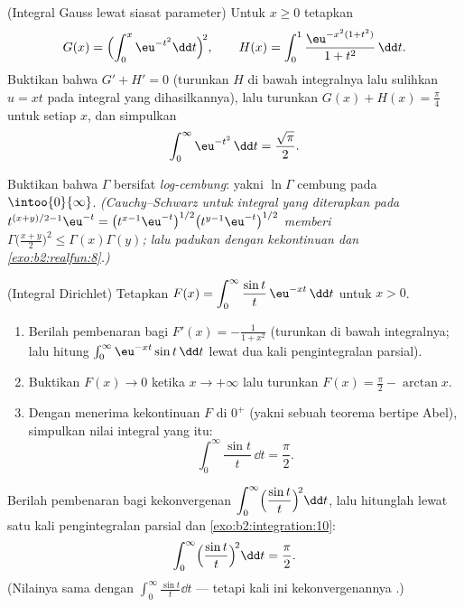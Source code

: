 \begin{exercise}[$\star\star\star$]\label{exo:b2:integration:8}
(Integral Gauss lewat siasat parameter) Untuk $x \geq 0$ tetapkan
\[
G(x) = \Bigl(\int_0^x \eu^{-t^2}\dd t\Bigr)^{\!2},
\qquad
H(x) = \int_0^1 \frac{\eu^{-x^2(1+t^2)}}{1 + t^2}\,\dd t .
\]
Buktikan bahwa $G' + H' = 0$ (turunkan $H$ di bawah integralnya lalu
sulihkan $u = xt$ pada integral yang dihasilkannya), lalu turunkan $G(x)
+ H(x) = \frac\pi4$ untuk setiap $x$, dan simpulkan
\[
\int_0^{\infty} \eu^{-t^2}\,\dd t = \frac{\sqrt\pi}{2} .
\]
\end{exercise}

\begin{exercise}[$\star\star\star$]\label{exo:b2:integration:9}
Buktikan bahwa $\Gamma$ bersifat \emph{log-cembung}: yakni $\ln\Gamma$
cembung pada $\intoo{0}{\infty}$. \emph{(Cauchy--Schwarz untuk integral
yang diterapkan pada $t^{(x+y)/2 - 1}\eu^{-t} =
\bigl(t^{x-1}\eu^{-t}\bigr)^{1/2} \bigl(t^{y-1}\eu^{-t}\bigr)^{1/2}$
memberi $\Gamma\bigl(\frac{x+y}{2}\bigr)^2 \leq \Gamma(x)\Gamma(y)$;
lalu padukan dengan kekontinuan dan \cref{exo:b2:realfun:8}.)}
\end{exercise}

\begin{exercise}[$\star\star\star$]\label{exo:b2:integration:10}
(Integral Dirichlet) Tetapkan $F(x) = \displaystyle\int_0^{\infty}
\frac{\sin t}{t}\,\eu^{-xt}\,\dd t$ untuk $x > 0$.
\begin{enumerate}
  \item Berilah pembenaran bagi $F'(x) = -\frac{1}{1 + x^2}$ (turunkan
        di bawah integralnya; lalu hitung $\int_0^\infty
        \eu^{-xt}\sin t\,\dd t$ lewat dua kali pengintegralan parsial).
  \item Buktikan $F(x) \to 0$ ketika $x \to +\infty$ lalu turunkan $F(x)
        = \frac\pi2 - \arctan x$.
  \item Dengan menerima kekontinuan $F$ di $0^+$ (yakni sebuah
        teorema bertipe Abel), simpulkan nilai integral yang
         itu:
        \[
        \int_0^{\infty} \frac{\sin t}{t}\,\dd t = \frac{\pi}{2}.
        \]
\end{enumerate}
\end{exercise}

\begin{exercise}[$\star\star$]\label{exo:b2:integration:11}
Berilah pembenaran bagi kekonvergenan $\displaystyle\int_0^\infty
\Bigl(\frac{\sin t}{t}\Bigr)^{\!2}\dd t$, lalu hitunglah lewat satu
kali pengintegralan parsial dan \cref{exo:b2:integration:10}:
\[
\int_0^\infty \Bigl(\frac{\sin t}{t}\Bigr)^{\!2}\dd t
= \frac{\pi}{2} .
\]
(Nilainya sama dengan $\int_0^\infty \frac{\sin t}{t}\dd t$ --- tetapi
kali ini kekonvergenannya .)
\end{exercise}

